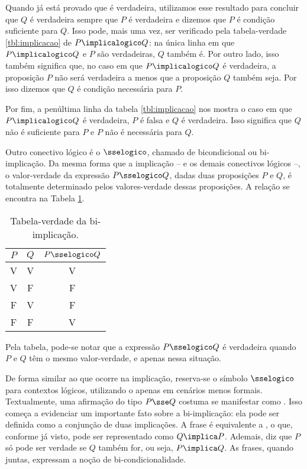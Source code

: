 Quando já está provado que  é verdadeira, utilizamos esse resultado para concluir que $Q$ é verdadeira sempre que $P$ é verdadeira e dizemos que $P$ é condição suficiente para  $Q$. Isso pode, mais uma vez, ser verificado pela tabela-verdade \ref{tbl:implicacao} de $P \implicalogico Q$: na única linha em que $P \implicalogico Q$ e $P$ são verdadeiras, $Q$ também é. Por outro lado, isso também significa que, no caso em que $P \implicalogico Q$ é verdadeira, a proposição $P$ não será verdadeira a menos que a proposição $Q$ também seja. Por isso dizemos que $Q$ é condição necessária para $P$.

Por fim, a penúltima linha da tabela \ref{tbl:implicacao} nos mostra o caso em que $P \implicalogico Q$ é verdadeira, $P$ é falsa e $Q$ é verdadeira. Isso significa que $Q$ não é suficiente para $P$ e $P$ não é necessária para $Q$. 

Outro conectivo lógico é o $\sselogico$, chamado de bicondicional ou bi-implicação.
Da mesma forma que a implicação -- e os demais conectivos lógicos --, o valor-verdade da expressão $P \sselogico Q$, dadas duas proposições $P$ e $Q$, é totalmente determinado pelos valores-verdade dessas proposições.
A relação se encontra na Tabela \ref{tbl:bi-implicacao}.

\begin{table}[h]
	\centering
	\begin{tabular}{cc|c}
		$P$		& $Q$		& $P \sselogico Q$	\\ \hline
		V		& V			& V			\\
		V		& F			& F			\\
		F		& V			& F			\\
		F		& F			& V			\\	
	\end{tabular}
	\caption{Tabela-verdade da bi-implicação.}
	\label{tbl:bi-implicacao}
\end{table}

Pela tabela, pode-se notar que a expressão $P \sselogico Q$ é verdadeira quando $P$ e $Q$ têm o mesmo valor-verdade, e apenas nessa situação.

De forma similar ao que ocorre na implicação, reserva-se o símbolo $\sselogico$ para contextos lógicos, utilizando o \entreaspas{$\sse$} apenas em cenários menos formais. Textualmente, uma afirmação do tipo $P \sse Q$ costuma se manifestar como . Isso começa a evidenciar um importante fato sobre a bi-implicação: ela pode ser definida como a conjunção de duas implicações. A frase  é equivalente a , o que, conforme já visto, pode ser representado como $Q \implica P$. Ademais,  diz que $P$ só pode ser verdade se $Q$ também for, ou seja, $P \implica Q$. As frases, quando juntas, expressam a noção de bi-condicionalidade.

